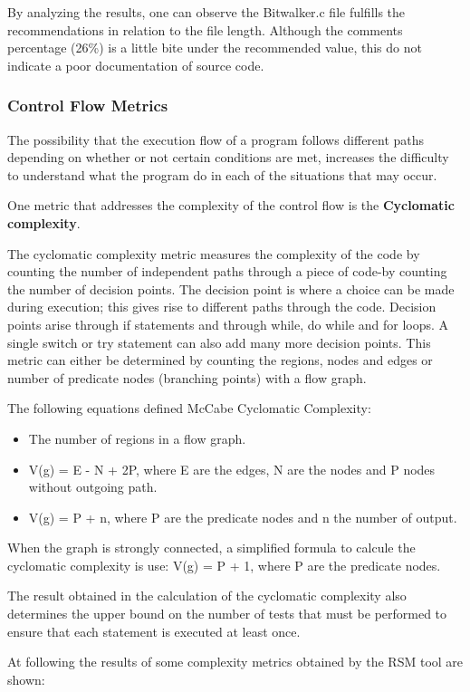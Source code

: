 By analyzing the results, one can observe the Bitwalker.c file fulfills the recommendations in relation to the file length. Although the comments percentage (26\%) is a little bite under the recommended value, this do not indicate a poor documentation of source code.

\subsubsection{Control Flow Metrics}
\label{sec:cyclo}
The possibility that the execution flow of a program follows different paths depending on whether or not certain conditions are met, increases the difficulty to understand what the program do in each of the situations that may occur.

One metric that addresses the complexity of the control flow is the \textbf{Cyclomatic complexity}. 

The cyclomatic complexity metric measures the complexity of the code by counting the number of independent paths through a piece of code-by counting the number of decision points. The decision point is where a choice can be made during execution; this gives rise to different paths through the code. Decision points arise through if statements and through while, do while and for loops. A single switch or try statement can also add many more decision points. This metric can either be determined by counting the regions, nodes and edges or number of predicate nodes (branching points) with a flow graph.


The following equations defined McCabe Cyclomatic Complexity: 
\begin{itemize}
\item The number of regions in a flow graph.
\item V(g) = E - N + 2P, where E are the edges, N are the nodes and P nodes without outgoing path.
\item V(g) = P + n, where P are the predicate nodes and n the number of output.
\end{itemize}

When the graph is strongly connected, a simplified formula to calcule the cyclomatic complexity is use: V(g) = P + 1, where P are the predicate nodes.

The result obtained in the calculation of the cyclomatic complexity also determines the upper bound on the number of tests that must be performed to ensure that each statement is executed at least once.

At following the results of some complexity metrics obtained by the RSM tool are shown:

